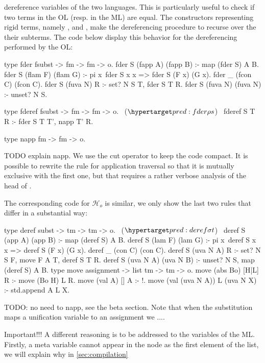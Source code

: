 \documentclass[sigconf,natbib=false]{acmart}
\newcommand{\Ho}{\ensuremath{\mathcal{H}_o}\xspace}
\begin{document}
dereference variables of the two languages. This is particularly useful to check
if two terms in the OL (resp. in the ML) are equal. The constructors
representing rigid terms, namely ,  and ,
make the dereferencing procedure to recurse over the their subterms. The code
below display this behavior for the dereferencing performed by the OL:

\begin{elpicode}
type fder fsubst -> fm -> fm -> o.
fder S (fapp A) (fapp B) :- map (fder S) A B.
fder S (flam F) (flam G) :- 
  pi x\ fder S x x => fder S (F x) (G x).
fder _ (fcon C) (fcon C).
fder S (fuva N) R :- set? N S T, fder S T R.
fder S (fuva N) (fuva N) :- unset? N S.

type fderef fsubst -> fm -> fm -> o.                 ~($\customlabel{pred:fder}{\rho s}$)~
fderef S T R :- fder S T T', napp T' R.

type napp fm -> fm -> o.
\end{elpicode}

\noindent
TODO explain napp.
We use the cut operator to keep the code compact. It is possible to rewrite
the rule for application traversal so that it is mutually exclusive with the
first one, but that requires a rather verbose analysis of the head of .

The corresponding code for \Ho is similar, we only show the last two rules that
differ in a substantial way:

\begin{elpicode}
type deref subst -> tm -> tm -> o.                   ~($\customlabel{pred:deref}{\sigma t}$)~
deref S (app A) (app B) :- map (deref S) A B.
deref S (lam F) (lam G) :- 
  pi x\ deref S x x => deref S (F x) (G x).
deref _ (con C) (con C).
deref S (uva N A) R :- set? N S F, move F A T, deref S T R.
deref S (uva N A) (uva N B) :- unset? N S, map (deref S) A B.
type move assignment -> list tm -> tm -> o.
move (abs Bo)        [H|L] R :- move (Bo H) L R.
move (val A)         []    A :- !.
move (val (uva N A)) L     (uva N X) :- std.append A L X.
\end{elpicode}

\noindent
TODO: no need to napp, see the beta section.
Note that when the substitution  maps a unification variable
 to an assignment  we ....

Important!!!
A different reasoning is to be addressed to the variables of the ML. Firstly, a
meta variable cannot appear in the  node as the first element of the
list, we will explain why in \cref{sec:compilation}
\end{document}
